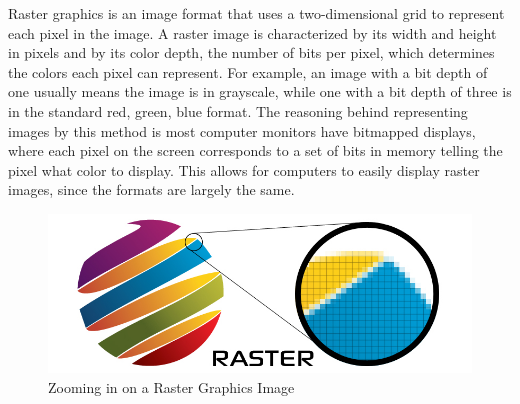 \documentclass[12pt]{article}
\begin{document}
Raster graphics is an image format that uses a two-dimensional grid to represent each pixel in the image. 
A raster image is characterized by its width and height in pixels and by its color depth, the number of bits per pixel, which determines the colors each pixel can represent. 
For example, an image with a bit depth of one usually means the image is in grayscale, while one with a bit depth of three is in the standard red, green, blue format. 
The reasoning behind representing images by this method is most computer monitors have bitmapped displays, where each pixel on the screen corresponds to a set of bits in memory telling the pixel what color to display. 
This allows for computers to easily display raster images, since the formats are largely the same.
\begin{figure}
\includegraphics[width=\textwidth]{raster.jpg}
\caption{Zooming in on a Raster Graphics Image}
\end{figure}
\end{document}
